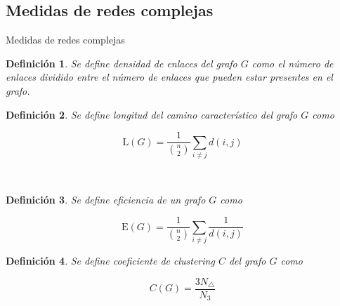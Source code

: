 \documentclass[hyperref={unicode}]{beamer}
\newtheorem{defi}{\textbf{\color{ExecusharesBlue}Definición}}
\begin{document}
\subsection{Medidas de redes complejas}
\begin{frame}{Medidas de redes complejas}
	
	\begin{minipage}[b][.35\textheight][t]{.47\textwidth}
		\begin{defi}
			Se define densidad de enlaces del grafo $G$ como el número de enlaces dividido entre el número de enlaces que pueden estar presentes en el grafo.
		\end{defi}
	\end{minipage}\hfill%
	\begin{minipage}[b][.35\textheight][t]{.47\textwidth}
		\begin{defi}
			Se define longitud del camino característico del grafo $G$ como
			
			\begin{equation}\label{eq:camino}
			\mathrm{L}({G}) = \dfrac{1}{\binom{n}{2}} \sum_{i\neq j} d(i,j)
			\end{equation}
		\end{defi}
	\end{minipage}\\[0.5em]
	\begin{minipage}[b][.35\textheight][t]{.47\textwidth}
		\begin{defi}
			Se define eficiencia de un grafo $G$ como
			
			\begin{equation}\label{eq:eficiencia}
			\mathrm{E}({G}) = \dfrac{1}{\binom{n}{2}} \sum_{i\neq j} \dfrac{1}{d(i,j)}
			\end{equation}
			
		\end{defi}
	\end{minipage}\hfill
	\begin{minipage}[b][.35\textheight][t]{.47\textwidth}
		\begin{defi}
			Se define coeficiente de clustering $C$ del grafo $G$ como
			
			\begin{equation}\label{eq:clustering}
			C(G) = \dfrac{3N_{\triangle}}{N_3}
			\end{equation}
		\end{defi}
	\end{minipage}%
\end{frame}
\end{document}
